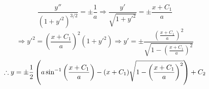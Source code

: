\item

\[
	\frac{y''}{{(1 + y'^2)}^{3/2}} = \pm \frac{1}{a}
	\Rightarrow \frac{y'}{\sqrt{1 + y'^2}} = \pm \frac{x + C_1}{a}
\]
\[
	\Rightarrow y'^2 = {\left( \frac{x + C_1}{a} \right)}^2 (1 + y'^2)
	\Rightarrow y' = \pm \frac{{\left( \frac{x + C_1}{a} \right)}^2}{\sqrt{1 - {\left( \frac{x + C_1}{a} \right)}^2}}
\]
\[
	\therefore y = \pm \frac{1}{2} \left( a \sin^{-1} \left( \frac{x + C_1}{a} \right) - (x + C_1) \sqrt{1 - {\left( \frac{x + C_1}{a} \right)}^2}\right) + C_2
\]